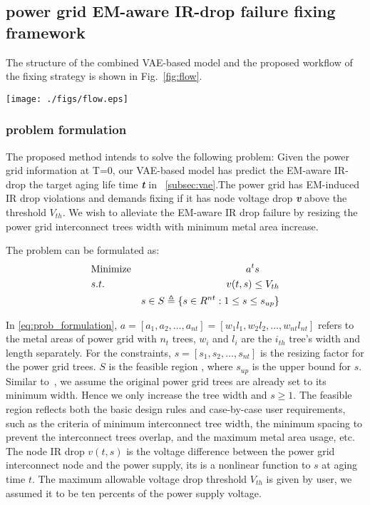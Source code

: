 \subsection{power grid EM-aware IR-drop failure fixing framework }
\label{subsec:formulation}

The structure of the combined VAE-based model and the proposed workflow of the fixing strategy is shown in Fig.~\ref{fig:flow}. 

\begin{figure*}[h!]
	\centering
	\captionsetup{justification=centering, margin=3cm}
	\texttt{[image: ./figs/flow.eps]}
	\caption{The proposed framework of VAE-accelerated power gird fixing method.}
	\label{fig:flow}
\end{figure*}



\subsubsection{problem formulation}
\label{subsubsec:formulation}
The proposed method intends to solve the following problem: 
Given the power grid information at T=0, our VAE-based model has predict the EM-aware IR-drop the target aging life time \textit{\textbf{t}} in ~\ref{subsec:vae}.The power grid has EM-induced IR drop violations and demands fixing if it has node voltage drop \textit{\textbf{v}}  above the threshold $V_{th}$.
We wish to alleviate the EM-aware IR drop failure by resizing the power grid interconnect trees width with minimum metal area increase.

The problem can be formulated as:
\begin{align}
	\label{eq:prob_formulation}
	&\mbox{Minimize}  & a^{t}s \qquad   \notag  \\
	&s.t.     & v(t,s)\leq V_{th} \\
	& \quad   &s \in S   \triangleq \{ s \in R^{nt}: 1 \leq s \leq s_{up} \}        \notag
\end{align}

In \eqref{eq:prob_formulation}, $a=[a_{1},a_{2},\ldots,a_{nt}] = [w_{1}l_{1},w_{2}l_{2},\ldots,w_{nt}l_{nt}]$ refers to the metal areas of power grid with $n_{t}$ trees, $w_{i}$ and $l_{i}$ are the $i_{th}$ tree's width and length separately.
For the constraints, $s=[s_{1},s_{2},\ldots,s_{nt}]$  is the resizing factor for the power grid trees. $S$ is the feasible region ,
where $s_{up}$ is the upper bound for $s$. Similar to~\cite{Sukharev:2019pg}, we assume the original power grid trees are already set to its minimum width. Hence we only increase the tree width and $s \geq 1 $.
The feasible region reflects both the basic design rules and case-by-case user requirements, such as the criteria of minimum interconnect tree width, the minimum spacing to prevent the  interconnect trees overlap, and the maximum metal area usage, etc. 
The node IR drop $v(t,s)$  is the voltage difference between the power grid interconnect node and the power supply, its is a nonlinear function to $s$ at aging time $t$. The maximum allowable voltage drop threshold $V_{th}$ is given by user, we assumed it to be ten percents of the power supply voltage.


